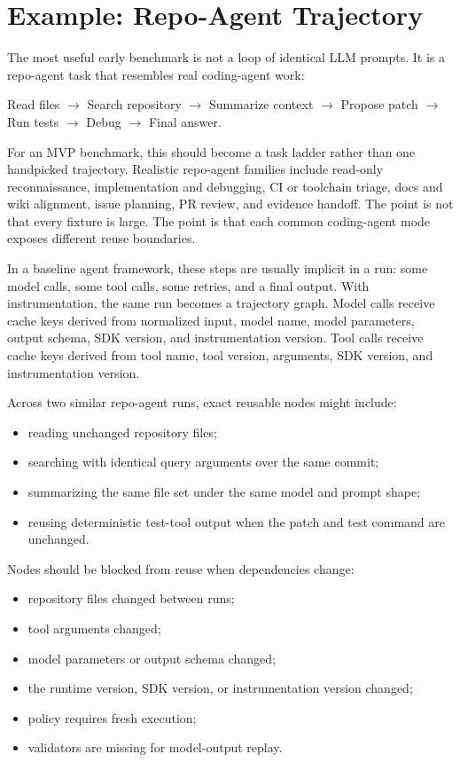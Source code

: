 \section{Example: Repo-Agent Trajectory}

The most useful early benchmark is not a loop of identical LLM prompts. It is a repo-agent task that resembles real coding-agent work:

\begin{center}
Read files $\rightarrow$ Search repository $\rightarrow$ Summarize context $\rightarrow$ Propose patch $\rightarrow$ Run tests $\rightarrow$ Debug $\rightarrow$ Final answer.
\end{center}

For an MVP benchmark, this should become a task ladder rather than one
handpicked trajectory. Realistic repo-agent families include read-only
reconnaissance, implementation and debugging, CI or toolchain triage, docs and
wiki alignment, issue planning, PR review, and evidence handoff. The point is
not that every fixture is large. The point is that each common coding-agent
mode exposes different reuse boundaries.

In a baseline agent framework, these steps are usually implicit in a run: some model calls, some tool calls, some retries, and a final output. With \migaki{} instrumentation, the same run becomes a trajectory graph. Model calls receive cache keys derived from normalized input, model name, model parameters, output schema, SDK version, and instrumentation version. Tool calls receive cache keys derived from tool name, tool version, arguments, SDK version, and instrumentation version.

Across two similar repo-agent runs, exact reusable nodes might include:

\begin{itemize}[leftmargin=1.5em]
  \item reading unchanged repository files;
  \item searching with identical query arguments over the same commit;
  \item summarizing the same file set under the same model and prompt shape;
  \item reusing deterministic test-tool output when the patch and test command are unchanged.
\end{itemize}

Nodes should be blocked from reuse when dependencies change:

\begin{itemize}[leftmargin=1.5em]
  \item repository files changed between runs;
  \item tool arguments changed;
  \item model parameters or output schema changed;
  \item the runtime version, SDK version, or instrumentation version changed;
  \item policy requires fresh execution;
  \item validators are missing for model-output replay.
\end{itemize}


